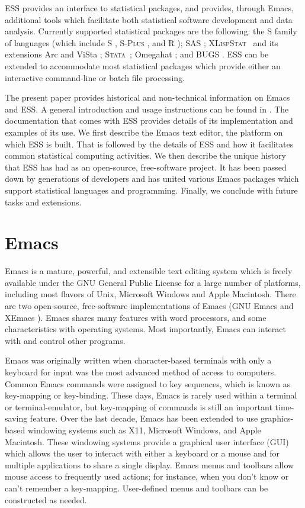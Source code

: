 \documentclass{article}
\newcommand*{\SAS}{\textsc{SAS}{\textregistered} }
\newcommand*{\Splus}{\textsc{S-Plus}}
\newcommand*{\XLispStat}{\textsc{XLispStat}}
\newcommand*{\Stata}{\textsc{Stata}}
\begin{document}
ESS provides an interface to statistical packages, and provides,
through Emacs, additional tools which facilitate both statistical
software development and data analysis.  Currently supported
statistical packages are the following:  the S family of languages (which include
S \citep{BecRCW88,ChaJH92,ChaJ98}, \Splus{} \citep{Splus}, and R
\citep{ihak:gent:1996}); \SAS \citep{SAS:8}; \XLispStat\ 
\citep{Tier90} and its extensions Arc \citep{Cook:Weisberg:1999} and
ViSta \citep{youn:fald:mcfa:1992}; \Stata\ \citep{Stata:6.0}; Omegahat
\citep{DTLang:2000}; and BUGS \citep{BUGS}.  ESS can be
extended to accommodate most statistical packages which provide either
an interactive command-line or batch file processing.

The present paper provides historical and non-technical information on
Emacs and ESS.  A general introduction and usage instructions can be
found in \cite{heiberger:dsc:2001}.  The documentation that comes with
ESS provides details of its implementation and examples of its use.
We first describe the Emacs text editor, the platform on which ESS is
built.  That is followed by the details of ESS and how it facilitates
common statistical computing activities.  We then describe the unique
history that ESS has had as an open-source, free-software project.  
It has been passed down by generations of developers and has 
united various Emacs packages which support
statistical languages and programming.  Finally, we conclude with
future tasks and extensions.

\section{Emacs}
\label{sec:emacs}

Emacs is a mature, powerful, and extensible text editing system which
is freely available under the GNU General Public License for a large
number of platforms, including most flavors of Unix, Microsoft Windows
and Apple Macintosh.  There are two open-source, free-software
implementations of Emacs (GNU Emacs \citep{GNU Emacs} and XEmacs
\citep{XEmacs}).  Emacs shares many features with
word processors, and some characteristics with operating systems.
Most importantly, Emacs can interact with and control other programs.

Emacs was originally written when character-based terminals with only
a keyboard for input was the most advanced method of access to
computers.  Common Emacs commands were assigned to key sequences,
which is known as key-mapping or key-binding.  These days, Emacs is
rarely used within a terminal or terminal-emulator, but key-mapping of
commands is still an important time-saving feature.  Over the last
decade, Emacs has been extended to use graphics-based windowing
systems such as X11, Microsoft Windows, and Apple Macintosh.  These
windowing systems provide a graphical user interface (GUI) which
allows the user to interact with either a keyboard or a mouse and for
multiple applications to share a single display.  Emacs menus and
toolbars allow mouse access to frequently used actions; for instance,
when you don't know or can't remember a key-mapping.  User-defined
menus and toolbars can be constructed as needed.
\end{document}
